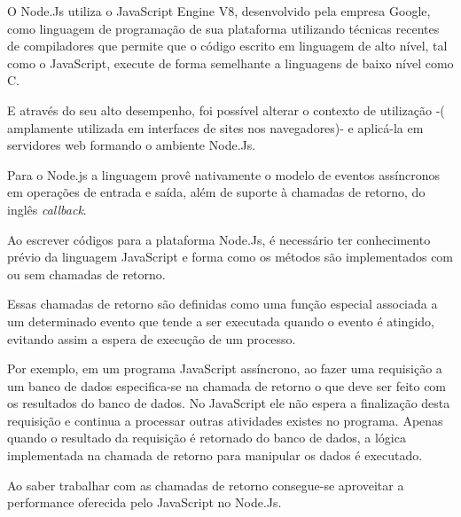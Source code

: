   O Node.Js utiliza o JavaScript Engine V8, desenvolvido pela empresa Google, como linguagem de programação
  de sua plataforma utilizando técnicas recentes de compiladores que permite que o código escrito em linguagem de alto nível,
  tal como o JavaScript, execute de forma semelhante a linguagens de baixo nível como C. 
  
  E através do seu alto desempenho, foi possível alterar o contexto de utilização -(
  amplamente utilizada em interfaces de sites nos navegadores)- e aplicá-la em servidores web formando 
  o ambiente Node.Js.
  
  
  Para o Node.js a linguagem provê nativamente o modelo de eventos assíncronos em operações de entrada e saída, 
  além de suporte à chamadas de retorno, do inglês \textit{callback}.\cite{Oliveira:2012}
  
  
  Ao escrever códigos para a plataforma Node.Js, é necessário ter conhecimento prévio da linguagem JavaScript e forma como os 
  métodos são implementados com ou sem chamadas de retorno. \cite{Hughes:2012}
  

  Essas chamadas de retorno são definidas como uma função especial associada a um determinado evento que tende a ser 
  executada quando o evento é atingido, evitando assim a espera de execução de um processo.\cite{Wilson:2013} 
  
  Por exemplo, em um programa JavaScript assíncrono, ao fazer uma requisição 
  a um banco de dados especifica-se na chamada de retorno o que deve ser feito com os resultados do banco de dados. No JavaScript
  ele não espera a finalização desta requisição e continua a processar outras atividades existes no programa. 
  Apenas quando o resultado da requisição é retornado do banco de dados, a lógica implementada na chamada de retorno para manipular 
  os dados é executado. \cite[p. 2]{Junior:2012}
  
  Ao saber trabalhar com as chamadas de retorno consegue-se aproveitar a performance oferecida pelo JavaScript no Node.Js.
  
